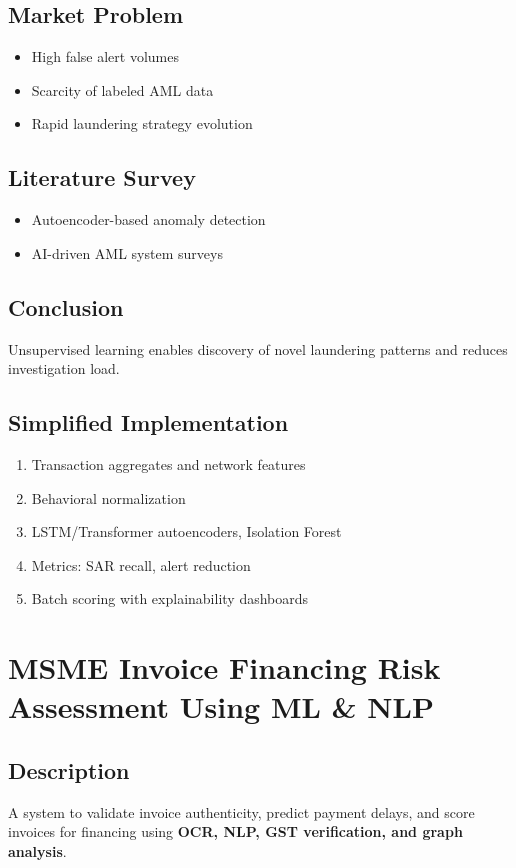 \documentclass[11pt,a4paper]{article}
\begin{document}
\subsection*{Market Problem}
\begin{itemize}[noitemsep]
    \item High false alert volumes
    \item Scarcity of labeled AML data
    \item Rapid laundering strategy evolution
\end{itemize}

\subsection*{Literature Survey}
\begin{itemize}[noitemsep]
    \item Autoencoder-based anomaly detection
    \item AI-driven AML system surveys
\end{itemize}

\subsection*{Conclusion}
Unsupervised learning enables discovery of novel laundering patterns and reduces investigation load.

\subsection*{Simplified Implementation}
\begin{enumerate}[noitemsep]
    \item Transaction aggregates and network features
    \item Behavioral normalization
    \item LSTM/Transformer autoencoders, Isolation Forest
    \item Metrics: SAR recall, alert reduction
    \item Batch scoring with explainability dashboards
\end{enumerate}

\section{MSME Invoice Financing Risk Assessment Using ML \& NLP}

\subsection*{Description}
A system to validate invoice authenticity, predict payment delays, and score invoices for financing using \textbf{OCR, NLP, GST verification, and graph analysis}.
\end{document}
